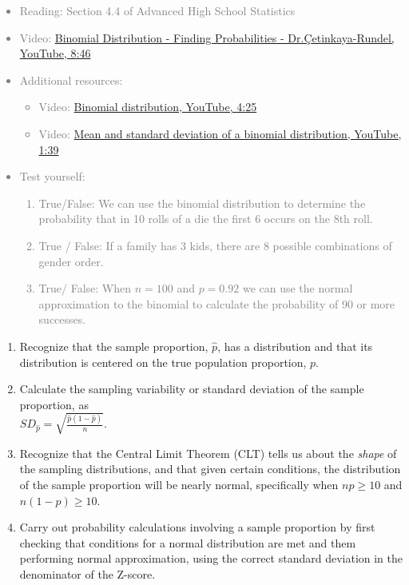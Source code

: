 \documentclass[11pt]{article}
\newcommand{\gray}[1]{\textcolor{gray}{#1}}
\begin{document}
\gray{
{\it
\vspace{-0.75cm}
\begin{itemize}
\renewcommand{\labelitemi}{{\textcolor{oiB}{$\ast$}}}
\item Reading: Section 4.4 of Advanced High School Statistics
\item Video: \href{http://www.youtube.com/watch?v=tKmyzhvgudw}{Binomial Distribution - Finding Probabilities - Dr.\c{C}etinkaya-Rundel, YouTube, 8:46}
\item Additional resources:
\begin{itemize}
\item Video: \href{http://www.youtube.com/watch?v=oYeJBdCGwxk&list=PL568547ACA9211CCA&index=28&feature=plpp_video}{Binomial distribution, YouTube, 4:25}
\item Video: \href{http://www.youtube.com/watch?v=0er3EiM-bpg&list=PL568547ACA9211CCA&index=27&feature=plpp_video}{Mean and standard deviation of a binomial distribution, YouTube, 1:39} 
\end{itemize}
\item Test yourself: 
\begin{enumerate}
\item True/False: We can use the binomial distribution to determine the probability that in 10 rolls of a die the first 6 occurs on the 8th roll.
\item True / False: If a family has 3 kids, there are 8 possible combinations of gender order.
\item True/ False: When $n = 100$ and $p = 0.92$ we can use the normal approximation to the binomial to calculate the probability of 90 or more successes.
\end{enumerate}
\end{itemize}
}}

%

\vspace{0.48cm}
\begin{enumerate}[resume]
\renewcommand\labelenumi{\textcolor{oiB}{\textbf{LO \theenumi.}}}
\item Recognize that the sample proportion, $\hat{p}$, has a distribution and that its distribution is centered on the true population proportion, $p$.
\item Calculate the sampling variability or standard deviation of the sample proportion, as \\$SD_{\hat{p}} = \sqrt{\frac{\hat{p}(1-\hat{p})}{n}}$.
\item Recognize that the Central Limit Theorem (CLT) tells us about the \textit{shape} of the sampling distributions, and that given certain conditions, the distribution of the sample proportion will be nearly normal, specifically when $np\ge 10$ and $n(1-p)\ge 10$.
\item Carry out probability calculations involving a sample proportion by first checking that conditions for a normal distribution are met and them performing normal approximation, using the correct standard deviation in the denominator of the Z-score.
\end{enumerate}
\end{document}
